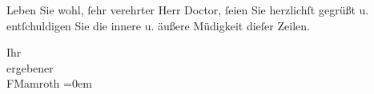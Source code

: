 \pstart
           Leben Sie wohl, ſehr verehrter Herr Doctor, ſeien Sie herzlichſt gegrüßt u. entſchuldigen
          Sie die innere u. äußere Müdigkeit dieſer Zeilen.\pend
           
\pstart
           Ihr{\\[\baselineskip]}ergebener{\\[\baselineskip]}\spacefill\mbox{FMamroth}\pend
           \leftskip=0em{}\endnumbering{}  
      